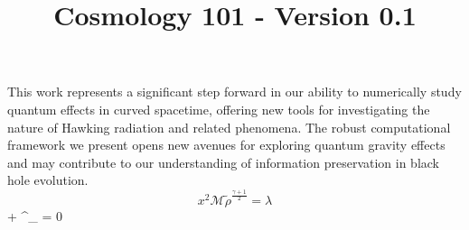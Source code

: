 \documentclass{article}\usepackage{graphicx} \usepackage{amsmath} \usepackage{colortbl}\title{Cosmology 101 - Version 0.1}
\begin{document}
This work represents a significant step forward in our ability to numerically study quantum effects in curved spacetime, offering new tools for investigating the nature of Hawking radiation and related phenomena. The robust computational framework we present opens new avenues for exploring quantum gravity effects and may contribute to our understanding of information preservation in black hole evolution. \begin{equation}x^2 \mathcal{M} \tilde{\rho }^{\frac{\gamma +1}{2}}=\lambda \label{Mi ecuacion 8} \end{equation} + \Gamma^{\mu}_{\alpha\beta} = 0
\end{document}
